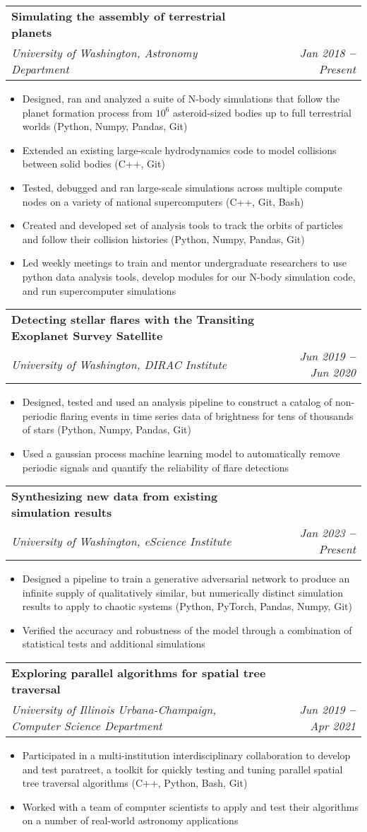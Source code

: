 \documentclass[letterpaper,11pt]{article}
\makeatletter
\newcommand{\resumeItem}[1]{
  \item\small{
    {#1 \vspace{-2pt}}
  }
}
\newcommand{\resumeSubheading}[4]{
  \vspace{-2pt}\item
    \begin{tabular*}{0.97\textwidth}[t]{l@{\extracolsep{\fill}}r}
      \textbf{#1} & #2 \\
      \textit{\small#3} & \textit{\small #4} \\
    \end{tabular*}\vspace{-7pt}
}
\newcommand{\resumeItemListStart}{\begin{itemize}}
\newcommand{\resumeItemListEnd}{\end{itemize}\vspace{-5pt}}
\makeatother
\begin{document}
    \resumeSubheading
      {Simulating the assembly of terrestrial planets}{}
      {University of Washington, Astronomy Department}{Jan 2018 \textbf{--} Present}
        \resumeItemListStart
            \resumeItem{Designed, ran and analyzed a suite of N-body simulations that follow the planet formation process from $10^{6}$ asteroid-sized bodies up to full terrestrial worlds (Python, Numpy, Pandas, Git)}
            \resumeItem{Extended an existing large-scale hydrodynamics code to model collisions between solid bodies (C++, Git)}
            \resumeItem{Tested, debugged and ran large-scale simulations across multiple compute nodes on a variety of national supercomputers (C++, Git, Bash)}
            \resumeItem{Created and developed set of analysis tools to track the orbits of particles and follow their collision histories (Python, Numpy, Pandas, Git)}
            \resumeItem{Led weekly meetings to train and mentor undergraduate researchers to use python data analysis tools, develop modules for our N-body simulation code, and run supercomputer simulations}
        \resumeItemListEnd
    
    \resumeSubheading
      {Detecting stellar flares with the Transiting Exoplanet Survey Satellite}{}
      {University of Washington, DIRAC Institute}{Jun 2019 \textbf{--} Jun 2020}
        \resumeItemListStart
            \resumeItem{Designed, tested and used an analysis pipeline to construct a catalog of non-periodic flaring events in time series data of brightness for tens of thousands of stars (Python, Numpy, Pandas, Git)}
            \resumeItem{Used a gaussian process machine learning model to automatically remove periodic signals and quantify the reliability of flare detections}
        \resumeItemListEnd
        
      \resumeSubheading
      {Synthesizing new data from existing simulation results}{}
      {University of Washington, eScience Institute}{Jan 2023 \textbf{--} Present}
        \resumeItemListStart
            \resumeItem{Designed a pipeline to train a generative adversarial network to produce an infinite supply of qualitatively similar, but numerically distinct simulation results to apply to chaotic systems (Python, PyTorch, Pandas, Numpy, Git)}
            \resumeItem{Verified the accuracy and robustness of the model through a combination of statistical tests and additional simulations}
        \resumeItemListEnd
        
        \resumeSubheading
      {Exploring parallel algorithms for spatial tree traversal}{}
      {University of Illinois Urbana-Champaign, Computer Science Department}{Jun 2019 \textbf{--} Apr 2021}
        \resumeItemListStart
            \resumeItem{Participated in a multi-institution interdisciplinary collaboration to develop and test {\sc paratreet}, a toolkit for quickly testing and tuning parallel spatial tree traversal algorithms (C++, Python, Bash, Git)}
            \resumeItem{Worked with a team of computer scientists to apply and test their algorithms on a number of real-world astronomy applications}
        \resumeItemListEnd
        
\end{document}
